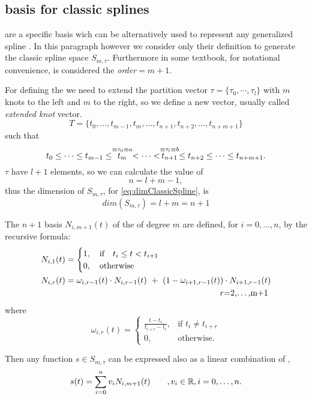 \documentclass[dissertation.tex]{subfiles}
\begin{document}
\subsection{\bss basis for classic
  splines}\label{sec:bsplines}\index{\bss}
\emph{\bss} are a specific basis wich can be alternatively used to
represent any generalized spline \cite{deboor}\cite{farin}. In this
paragraph however we consider only their definition to generate the
classic spline space $S_{m,\tau}$. Furthermore in some textbook, for
notational convenience, is considered the
\emph{order}$=m+1$.

For defining the \bss \cite{deboor} we need to extend the partition vector
$\tau=\{\tau_0,\cdots,\tau_l\}$ with $m$ knots to the left and $m$ to
the right, so we define a new vector, usually called \emph{extended knot} vector.
$$
T=\{t_0,\dots,t_{m-1},t_{m},\dots,t_{n+1},t_{n+2},\dots,t_{n+m+1}\}
$$
such that
\begin{equation*}
  t_0\leq\dots\leq t_{m-1}\leq \stackrel{\equiv\tau_0\equiv a}{t_{m}}<\dots<\stackrel{\equiv\tau_l\equiv b}{t_{n+1}}\leq t_{n+2}\leq\dots\leq t_{n+m+1}.    
\end{equation*}
$\tau$ have $l+1$ elements, so we can calculate the value of
$$
n=l+m-1,
$$
thus the dimension of $S_{m,\tau}$, for
\cref{eq:dimClassicSpline}, is 
\begin{equation*}
  dim(S_{m,\tau})=l+m=n+1  
\end{equation*}

The $n+1$ basis $N_{i,m+1}(t)$ of the \bss of degree $m$ are defined,
for $i=0,\dots,n$, by the recursive formula:
\begin{align*}
  N_{i,1}(t) &=
  \begin{cases}
    1,\quad \mbox{if}\quad t_i\leq t<t_{i+1}\\
    0,\quad \mbox{otherwise}
  \end{cases}\\
  N_{i,r}(t) &= \omega_{i,r-1}(t)\cdot N_{i,r-1}(t)\ +\
  (1-\omega_{i+1,r-1}(t))\cdot N_{i+1,r-1}(t)\\
             &\pushright r=2,\dots,m+1
\end{align*}
where
$$
\omega_{i,r}(t) = \begin{cases}
  \frac{t-t_i}{t_{i+r}-t_i},&\mbox{if }t_i\neq t_{i+r}\\
  0, &\mbox{otherwise.}
\end{cases}
$$

Then any function $s\in S_{m,\tau}$ can be expressed also as a linear
combination of \bss,
\begin{equation}\label{eq:bsplineElement}
  s(t)=\sum_{i=0}^nv_i N_{i,m+1}(t)\qquad, v_i\in\mathbb{R}, i=0,\dots,n.
\end{equation}
\end{document}
